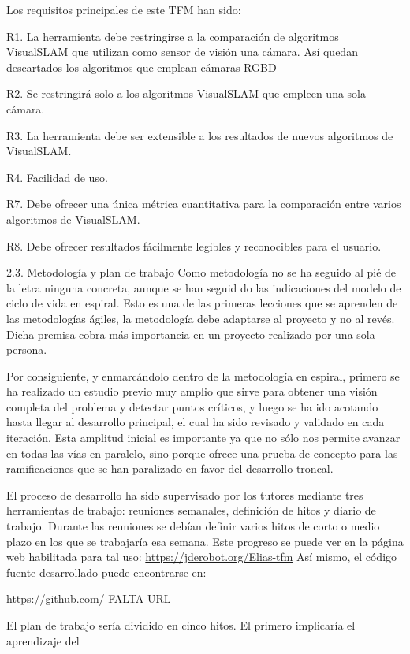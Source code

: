 Los requisitos principales de este TFM han sido:

	R1. La herramienta debe restringirse a la comparación de algoritmos VisualSLAM que utilizan como sensor de visión una cámara. Así quedan descartados los algoritmos que emplean cámaras RGBD

	R2. Se restringirá solo a los algoritmos VisualSLAM que empleen una sola cámara.

	R3. La herramienta debe ser extensible a los resultados de nuevos algoritmos de VisualSLAM.

	R4. Facilidad de uso.

	R7. Debe ofrecer una única métrica cuantitativa para la comparación entre varios algoritmos de VisualSLAM.

	R8. Debe ofrecer resultados fácilmente legibles y reconocibles para el usuario.

2.3. Metodología y plan de trabajo
Como metodología no se ha seguido al pié de la letra ninguna concreta, aunque se han seguid do las indicaciones del modelo de ciclo de vida en espiral. Esto es una de las primeras lecciones que se aprenden de las metodologías ágiles, la metodología debe adaptarse al proyecto y no al revés. Dicha premisa cobra más importancia en un proyecto realizado por una sola persona.

Por consiguiente, y enmarcándolo dentro de la metodología en espiral, primero se ha realizado un estudio previo muy amplio que sirve para obtener una visión completa del problema y detectar puntos críticos, y luego se ha ido acotando hasta llegar al desarrollo principal, el cual ha sido revisado y validado en cada iteración. Esta amplitud inicial es importante ya que no sólo nos permite avanzar en todas las vías en paralelo, sino porque ofrece una prueba de concepto para las ramificaciones que se han paralizado en favor del desarrollo troncal.

El proceso de desarrollo ha sido supervisado por los tutores mediante tres herramientas de trabajo: reuniones semanales, definición de hitos y diario de trabajo.
Durante las reuniones se debían definir varios hitos de corto o medio plazo en los que se trabajaría esa semana. Este progreso se puede ver en la página web habilitada para tal uso:
\url{https://jderobot.org/Elias-tfm}
Así mismo, el código fuente desarrollado puede encontrarse en:

\url{https://github.com/ FALTA URL}

El plan de trabajo sería dividido en cinco hitos. El primero implicaría el aprendizaje del

